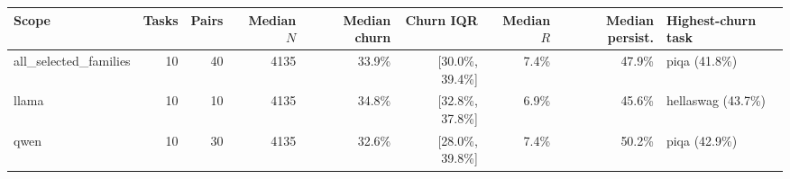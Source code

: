 \begin{tabular}{lrrrrrrrl}
\toprule
Scope & Tasks & Pairs & Median $N$ & Median churn & Churn IQR & Median $R$ & Median persist. & Highest-churn task \\
\midrule
all\_selected\_families & 10 & 40 & 4135 & 33.9\% & [30.0\%, 39.4\%] & 7.4\% & 47.9\% & piqa (41.8\%) \\
llama & 10 & 10 & 4135 & 34.8\% & [32.8\%, 37.8\%] & 6.9\% & 45.6\% & hellaswag (43.7\%) \\
qwen & 10 & 30 & 4135 & 32.6\% & [28.0\%, 39.8\%] & 7.4\% & 50.2\% & piqa (42.9\%) \\
\bottomrule
\end{tabular}
